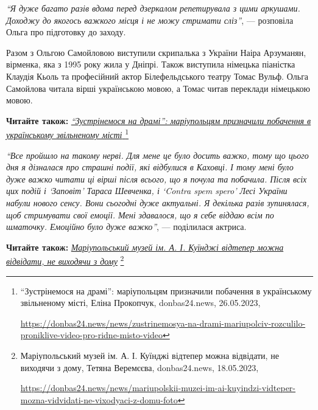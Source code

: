 
\begin{leftbar}
\emph{\enquote{Я дуже багато разів вдома перед дзеркалом репетирувала з цими аркушами.
Доходжу до якогось важкого місця і не можу стримати сліз}}, — розповіла
Ольга про підготовку до заходу.
\end{leftbar}

Разом з Ольгою Самойловою виступили скрипалька з України Наіра Арзуманян,
вірменка, яка з 1995 року жила у Дніпрі. Також виступила німецька піаністка
Клаудія Кьоль та професійний актор Білефельдського театру Томас Вульф. Ольга
Самойлова читала вірші українською мовою, а Томас читав переклади німецькою
мовою.

\textbf{Читайте також:} \href{https://donbas24.news/news/zustrinemosya-na-drami-mariupolciv-rozculilo-proniklive-video-pro-ridne-misto-video}{\emph{\enquote{Зустрінемося на драмі}: маріупольцям призначили побачення в українському звільненому місті }}%
\footnote{\enquote{Зустрінемося на драмі}: маріупольцям призначили побачення в українському звільненому місті, Еліна Прокопчук, donbas24.news, 26.05.2023, \par%
\url{https://donbas24.news/news/zustrinemosya-na-drami-mariupolciv-rozculilo-proniklive-video-pro-ridne-misto-video}%
}


\begin{leftbar}
\emph{\enquote{Все пройшло на такому нерві. Для мене це було досить важко, тому що
цього дня я дізналася про страшні події, які відбулися в Каховці. І
тому мені було дуже важко читати ці вірші після всього, що я почула та
побачила. Після всіх цих подій і \enquote{Заповіт} Тараса Шевченка, і \enquote{Contra
spem spero} Лесі України набули нового сенсу. Вони сьогодні дуже
актуальні. Я декілька разів зупинялася, щоб стримувати свої емоції.
Мені здавалося, що я себе віддаю всім по шматочку. Емоційно було дуже
важко}}, — поділилася актриса. 
\end{leftbar}

\textbf{Читайте також:} \href{https://donbas24.news/news/mariupolskii-muzei-im-ai-kuyindzi-vidteper-mozna-vidvidati-ne-vixodyaci-z-domu-foto}{\emph{Маріупольський музей ім. А. І. Куїнджі відтепер можна відвідати, не виходячи з дому}}%
\footnote{Маріупольський музей ім. А. І. Куїнджі відтепер можна відвідати, не виходячи з дому, Тетяна Веремєєва, donbas24.news, 18.05.2023, \par%
\url{https://donbas24.news/news/mariupolskii-muzei-im-ai-kuyindzi-vidteper-mozna-vidvidati-ne-vixodyaci-z-domu-foto}%
}


